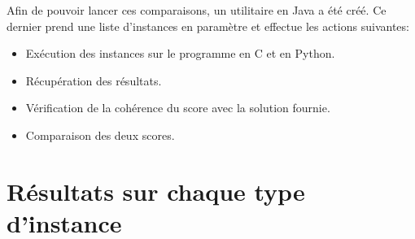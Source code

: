 \documentclass[hideweeklyreports]{polytech/polytech}
\begin{document}
			Afin de pouvoir lancer ces comparaisons, un utilitaire en Java a été créé. Ce dernier prend une liste d'instances en paramètre et effectue les actions suivantes:
			\begin{itemize}
				\item Exécution des instances sur le programme en C et en Python.
				\item Récupération des résultats.
				\item Vérification de la cohérence du score avec la solution fournie.
				\item Comparaison des deux scores.
			\end{itemize}
		
		\appendix
		\chapter{\label{exemplesGraphes}Résultats sur chaque type d'instance}
\end{document}
